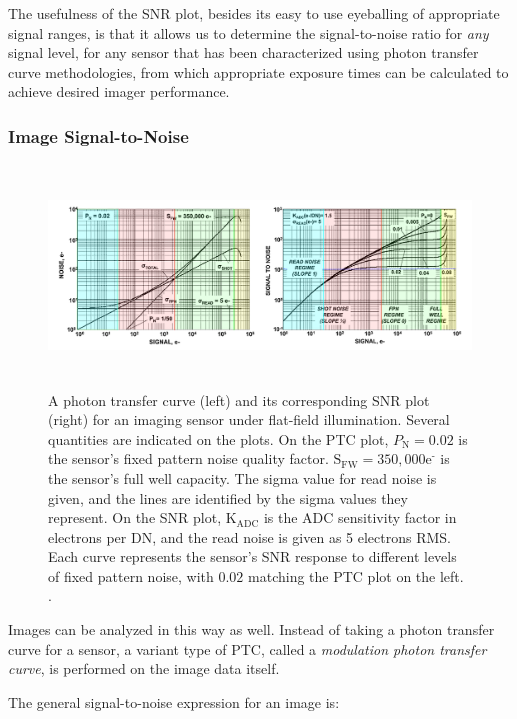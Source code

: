 \documentclass[10pt]{article}
\begin{document}
The usefulness of the SNR plot, besides its easy to use eyeballing of appropriate signal ranges, is that it allows us to determine the signal-to-noise ratio for \emph{any} signal level, for any sensor that has been characterized using photon transfer curve methodologies, from which appropriate exposure times can be calculated to achieve desired imager performance. 

\subsubsection{Image Signal-to-Noise}

\begin{figure}[!t]
    \centering
        \includegraphics[height=2.31in]{SNR Plot 2 Double.png}
    \caption{A photon transfer curve (left) and its corresponding SNR plot (right) for an imaging sensor under flat-field illumination. Several quantities are indicated on the plots. On the PTC plot, $P_{\text{N}} = 0.02$ is the sensor's fixed pattern noise quality factor. $\text{S}_{\text{FW}} = 350,000 \text{e}^{\text{-}}$ is the sensor's full well capacity. The sigma value for read noise is given, and the lines are identified by the sigma values they represent. On the SNR plot, $\text{K}_{\text{ADC}}$ is the ADC sensitivity factor in electrons per DN, and the read noise is given as 5 electrons RMS. Each curve represents the sensor's SNR response to different levels of fixed pattern noise, with $0.02$ matching the PTC plot on the left.   \cite{janesick}.}
    \label{fig:SNRregimes}
\end{figure}


Images can be analyzed in this way as well. Instead of taking a photon transfer curve for a sensor, a variant type of PTC, called a \emph{modulation photon transfer curve}, is performed on the image data itself. 

The general signal-to-noise expression for an image is:
\end{document}
